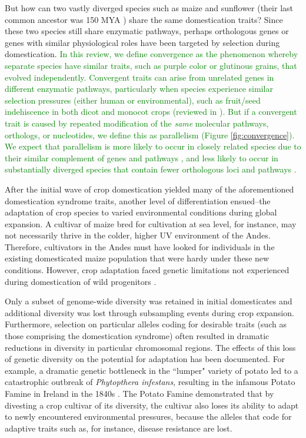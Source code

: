 \documentclass[12pt]{article}
\newcommand{\mw}[1]{\textcolor{green}{\normalsize #1}}
\begin{document}
But how can two vastly diverged species such as maize and sunflower  (their last common ancestor was 150 MYA \citep{Chang2004}) share the same domestication traits? 
Since these two species still share enzymatic pathways, perhaps orthologous genes or genes with similar physiological roles have been targeted by selection during domestication.
\mw{In this review, we define convergence as the phenomenon whereby separate species have similar traits, such as purple color or glutinous grains, that evolved independently. 
Convergent traits can arise from unrelated genes in different enzymatic pathways, particularly when species experience similar selection pressures (either human or environmental), such as fruit/seed indehiscence in both dicot and monocot crops (reviewed in \citep{Dong2015}).
But if a convergent trait is caused by repeated modification of the \emph{same} molecular pathways, orthologs, or nucleotides, we define this as parallelism \citep{Rosenblum2014} (Figure \ref{fig:convergence}). 
We expect that parallelism is more likely to occur in closely related species due to their similar complement of genes and pathways \citep{Pickersgill2018}, and less likely to occur in substantially diverged species that contain fewer orthologous loci and pathways \citep{Washburn2016, Pickersgill2018}.}

After the initial wave of crop domestication yielded many of the aforementioned domestication syndrome traits, another level of differentiation ensued--the adaptation of crop species to varied environmental conditions during global expansion.
A cultivar of maize bred for cultivation at sea level, for instance, may not necessarily thrive in the colder, higher UV environment of the Andes.
Therefore, cultivators in the Andes must have looked for individuals in the existing domesticated maize population that were hardy under these new conditions.
However, crop adaptation faced genetic limitations not experienced during domestication of wild progenitors \citep{Wang2017}. 

Only a subset of genome-wide diversity was retained in initial domesticates and additional diversity was lost through subsampling events during crop expansion.
Furthermore, selection on particular alleles coding for desirable traits (such as those comprising the domestication syndrome) often resulted in dramatic reductions in diversity in particular chromosomal regions.
The effects of this loss of genetic diversity on the potential for adaptation has been documented.
For example, a dramatic genetic bottleneck in the ``lumper" variety of potato led to a catastrophic outbreak of \emph{Phytopthera infestans}, resulting in the infamous Potato Famine in Ireland in the 1840s \citep{Goodwin1994}.
The Potato Famine demonstrated that by divesting a crop cultivar of its diversity, the cultivar also loses its ability to adapt to newly encountered environmental pressures, because the alleles that code for adaptive traits such as, for instance, disease resistance are lost.
\end{document}

